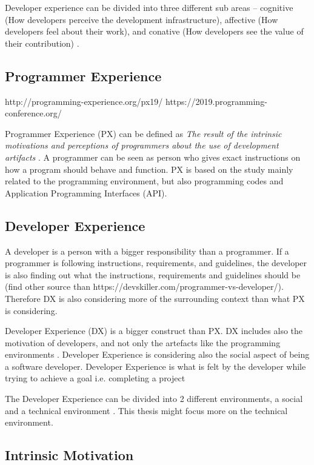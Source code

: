 \documentclass[english, 12pt, a4paper, sci, utf8, a-1b, online]{aaltothesis}
\begin{document}
Developer experience can be divided into three different sub areas – cognitive (How developers perceive the development infrastructure), affective (How developers feel about their work), and conative (How developers see the value of their contribution) \cite{fagerholm-dx-concept-and-definition}.

\subsection{Programmer Experience}

{
  \color{gray} http://programming-experience.org/px19/ https://2019.programming-conference.org/
}

Programmer Experience (PX) can be defined as \textit{The result of the intrinsic motivations and perceptions of programmers about the use of development artifacts} \cite{programmer-experience}. A programmer can be seen as person who gives exact instructions on how a program should behave and function. PX is based on the study mainly related to the programming environment, but also programming codes and Application Programming Interfaces (API).

\subsection{Developer Experience}

A developer is a person with a bigger responsibility than a programmer. If a programmer is following instructions, requirements, and guidelines, the developer is also finding out what the instructions, requirements and guidelines should be {\color{gray} (find other source than https://devskiller.com/programmer-vs-developer/).} Therefore DX is also considering more of the surrounding context than what PX is considering.

Developer Experience (DX) is a bigger construct than PX. DX includes also the motivation of developers, and not only the artefacts like the programming environments \cite{programmer-experience}. Developer Experience is considering also the social aspect of being a software developer. Developer Experience is what is felt by the developer while trying to achieve a goal i.e. completing a project

The Developer Experience can be divided into 2 different environments, a social and a technical environment \cite{fagerholm-doctoral-thesis}. This thesis might focus more on the technical environment.

\subsection{Intrinsic Motivation}
\end{document}
